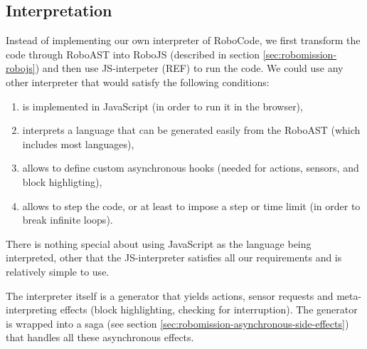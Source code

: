 \subsection{Interpretation}
\label{sec:robomission-interpretation}

Instead of implementing our own interpreter of RoboCode,
we first transform the code through RoboAST into RoboJS
(described in section \ref{sec:robomission-robojs})
and then use JS-interpeter (REF) to run the code.
We could use any other interpreter that would satisfy the following
conditions:
\begin{enumerate}
\item is implemented in JavaScript (in order to run it in the browser),
\item interprets a language that can be generated easily from the RoboAST
  (which includes most languages),
\item allows to define custom asynchronous hooks
  (needed for actions, sensors, and block highligting),
\item allows to step the code, or at least to impose a step or time limit
  (in order to break infinite loops).
\end{enumerate}
There is nothing special about using JavaScript as the language being interpreted,
other that the JS-interpreter satisfies all our requirements
and is relatively simple to use.

The interpreter itself is a generator that yields actions, sensor requests and
meta-interpreting effects (block highlighting, checking for interruption).
The generator is wrapped into a saga
(see section \ref{sec:robomission-asynchronous-side-effects})
that handles all these asynchronous effects.
